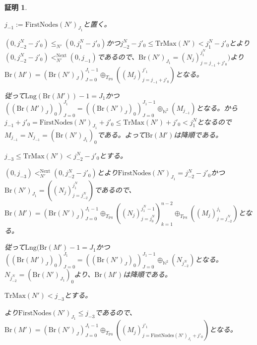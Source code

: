 \documentclass[dvipdfmx,uplatex]{jsarticle}
\theoremstyle{customnonumberbreakfortheorem}
\theoremstyle{customnonumberbreakforproof}
\newtheorem{hideableproof}{証明}
\begin{document}
\begin{hideableproof}
\begin{indented}
\begin{indented}
\begin{indented}
\begin{indented}
\begin{indented}
\begin{indented}
							\begin{indented}
								\item \(j_{-1} := \textrm{FirstNodes}(N')_{J_1}\)と置く。
								\item \((0,j_{-2}^N-j'_0) \leq_{N'} (0,j_1^N-j'_0)\)かつ\(j_{-2}^N-j'_0 \leq \textrm{TrMax}(N') < j_1^N-j'_0\)とより\((0,j_{-2}^N-j'_0) <_{N'}^{\textrm{Next}} (0,j_{-1})\)であるので、\(\textrm{Br}(N')_{J_1} = (N_j)_{j=j_{-1}+j'_0}^{j_1^N})\)より\(\textrm{Br}(M') = (\textrm{Br}(N')_J)_{J=0}^{J_1-1} \oplus_{T_{\textrm{PS}}} ((M_j)_{j=j_{-1}+j'_0}^{j'_1})\)となる。
								\item 従って\(\textrm{Lng}(\textrm{Br}(M'))-1 = J_1\)かつ\(((\textrm{Br}(M')_J)_0)_{J=0}^{J_1} = ((\textrm{Br}(N')_J)_0)_{J=0}^{J_1-1} \oplus_{\mathbb{N}^2} (M_{j_{-1}})\)となる。から\(j_{-1}+j'_0 = \textrm{FirstNodes}(N')_{J_1}+j'_0 \leq \textrm{TrMax}(N')+j'_0 < j_1^N\)となるので\(M_{j_{-1}} = N_{j_{-1}} = (\textrm{Br}(N')_{J_1})_0\)である。よって\(\textrm{Br}(M')\)は降順である。
							\end{indented}
							\item
							\item \(j_{-3} \leq \textrm{TrMax}(N') < j_{-2}^N-j'_0\)とする。
							\begin{indented}
								\item \((0,j_{-3}) <_{N'}^{\textrm{Next}} (0,j_{-2}^N-j'_0)\)とより\(\textrm{FirstNodes}(N')_{J_1} = j_{-2}^N-j'_0\)かつ\(\textrm{Br}(N')_{J_1} = ((N_j)_{j=j_{-2}^N}^{j_1^N})\)であるので、\(\textrm{Br}(M') = (\textrm{Br}(N')_J)_{J=0}^{J_1-1} \oplus_{T_{\textrm{PS}}} ((N_j)_{j=j_0^N}^{j_1^N-1})_{k=1}^{n-2} \oplus_{T_{\textrm{PS}}} ((M_j)_{j=j_{-2}^N}^{j_1})\)となる。
								\item 従って\(\textrm{Lng}(\textrm{Br}(M')-1 = J_1\)かつ\(((\textrm{Br}(M')_J)_0)_{J=0}^{J_1} = ((\textrm{Br}(N')_J)_0)_{J=0}^{J_1-1} \oplus_{\mathbb{N}^2} (N_{j_{-2}^N})\)となる。\(N_{j_{-2}^N} = (\textrm{Br}(N')_{J_1})_0\)より、\(\textrm{Br}(M')\)は降順である。
							\end{indented}
							\item
							\item \(\textrm{TrMax}(N') < j_{-3}\)とする。
							\begin{indented}
								\item {}より\(\textrm{FirstNodes}(N')_{J_1} \leq j_{-3}\)であるので、\(\textrm{Br}(M') = (\textrm{Br}(N')_J)_{J=0}^{J_1-1} \oplus_{T_{\textrm{PS}}} ((M_j)_{j = \textrm{FirstNodes}(N')_{J_1}+j'_0}^{j'_1})\)となる。

\end{indented}
\end{indented}
\end{indented}
\end{indented}
\end{indented}
\end{indented}
\end{indented}
\end{hideableproof}
\end{document}
